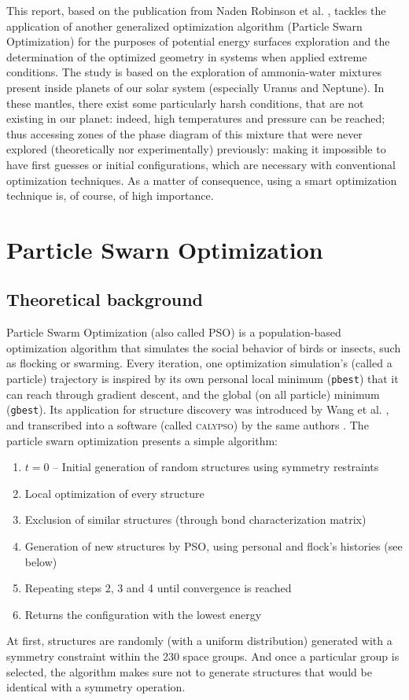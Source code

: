 \documentclass[11pt]{article}
\begin{document}
\begin{multicols}{2}
This report, based on the publication from Naden Robinson et al. \cite{original}, tackles the application of another generalized optimization algorithm (Particle Swarn Optimization) for the purposes of potential energy surfaces exploration and the determination of the optimized geometry in systems when applied extreme conditions. The study is based on the exploration of ammonia-water mixtures present inside planets of our solar system (especially Uranus and Neptune). In these mantles, there exist some particularly harsh conditions, that are not existing in our planet: indeed, high temperatures and pressure can be reached; thus accessing zones of the phase diagram of this mixture that were never explored (theoretically nor experimentally) previously: making it impossible to have first guesses or initial configurations, which are necessary with conventional optimization techniques. As a matter of consequence, using a smart optimization technique is, of course, of high importance.

\section*{Particle Swarn Optimization}
\subsection*{Theoretical background}
Particle Swarm Optimization (also called PSO) is a population-based optimization algorithm that simulates the social behavior of birds or insects, such as flocking or swarming. Every iteration, one optimization simulation's (called a particle) trajectory is inspired by its own personal local minimum (\verb+pbest+) that it can reach through gradient descent, and the global (on all particle) minimum (\verb+gbest+). Its application for structure discovery was introduced by Wang et al. \cite{PhysRevB.82.094116}, and transcribed into a software (called \textsc{calypso}) by the same authors \cite{WANG20122063}. The particle swarn optimization presents a simple algorithm:
\begin{enumerate}
\itemsep0em
    \item $t=0$ -- Initial generation of random structures using symmetry restraints
    \item Local optimization of every structure
    \item Exclusion of similar structures (through bond characterization matrix)
    \item Generation of new structures by PSO, using personal and flock's histories (see below)
    \item Repeating steps 2, 3 and 4 until convergence is reached
    \item Returns the configuration with the lowest energy
\end{enumerate}
At first, structures are randomly (with a uniform distribution) generated with a symmetry constraint within the 230 space groups. And once a particular group is selected, the algorithm makes sure not to generate structures that would be identical with a symmetry operation.


\end{multicols}
\end{document}

